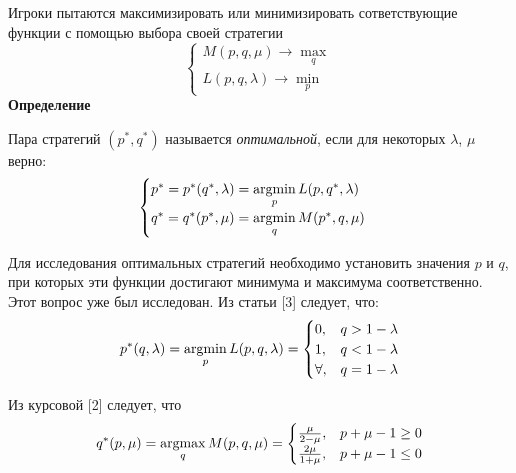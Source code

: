 \begin{flushleft}
Игроки пытаются максимизировать или минимизировать сответствующие функции с помощью выбора своей стратегии
\[
\begin{cases} M(p,q,\mu)\rightarrow\max\limits_{q} \\
L(p,q,\lambda)\rightarrow\min\limits_{p}\end{cases}
\]
\textbf{Определение}

Пара стратегий $(p^{*}, q^{*})$ называется \textit{оптимальной}, если для некоторых $\lambda$, $\mu$ верно:
\begin{equation}
\begin{cases} 
p^{*}=p^{*}(q^{*}, \lambda) = \operatorname*{argmin}\limits_{p} L(p, q^{*}, \lambda) \\ 
q^{*}=q^{*}(p^{*}, \mu) = \operatorname*{argmin}\limits_{q} M(p^{*}, q, \mu) \\
\end{cases}
\end{equation}
\vspace{5mm}

Для исследования оптимальных стратегий необходимо установить значения $p$ и $q$, при которых
эти функции достигают минимума и максимума соответственно. Этот вопрос уже был исследован. Из статьи [3] следует, что:
\begin{equation}
p^{*}(q, \lambda)=\operatorname*{argmin}\limits_{p}L(p,q,\lambda)=\begin{cases}0,& q>1-\lambda \\
1,& q<1-\lambda \\
\forall,& q=1-\lambda\end{cases}
\end{equation}

Из курсовой [2] следует, что
\begin{equation}
q^{*}(p, \mu)=\operatorname*{argmax}\limits_{q}M(p,q,\mu)=
\begin{cases}
\frac{\mu}{2-\mu},& p+\mu-1\geq 0 \\
\frac{2\mu}{1+\mu},& p+\mu-1\leq 0 \\
\end{cases}
\end{equation}

\end{flushleft}